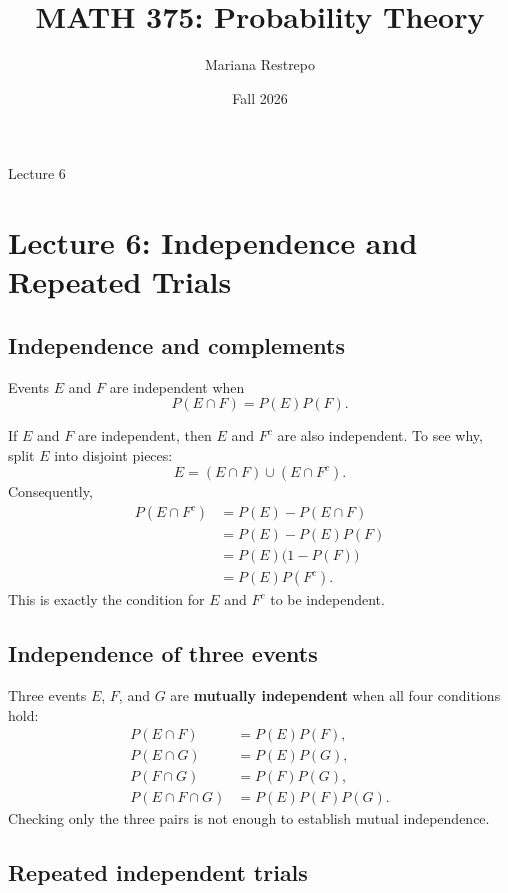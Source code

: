 \documentclass[11pt]{article}
\title{MATH 375: Probability Theory}
\author{Mariana Restrepo}
\date{Fall 2026}
\begin{document}
\maketitle

\begin{center}
\large Lecture 6
\end{center}

\tableofcontents

\section{Lecture 6: Independence and Repeated Trials}

\subsection{Independence and complements}

Events $E$ and $F$ are independent when
\[
P(E\cap F)=P(E)P(F).
\]

If $E$ and $F$ are independent, then $E$ and $F^c$ are also
independent. To see why, split $E$ into disjoint pieces:
\[
E=(E\cap F)\cup(E\cap F^c).
\]
Consequently,
\[
\begin{aligned}
P(E\cap F^c)
&=P(E)-P(E\cap F)\\
&=P(E)-P(E)P(F)\\
&=P(E)\bigl(1-P(F)\bigr)\\
&=P(E)P(F^c).
\end{aligned}
\]
This is exactly the condition for $E$ and $F^c$ to be independent.

\subsection{Independence of three events}

Three events $E$, $F$, and $G$ are \textbf{mutually independent}
when all four conditions hold:
\[
\begin{aligned}
P(E\cap F)&=P(E)P(F),\\
P(E\cap G)&=P(E)P(G),\\
P(F\cap G)&=P(F)P(G),\\
P(E\cap F\cap G)&=P(E)P(F)P(G).
\end{aligned}
\]
Checking only the three pairs is not enough to establish mutual
independence.

\subsection{Repeated independent trials}
\end{document}
